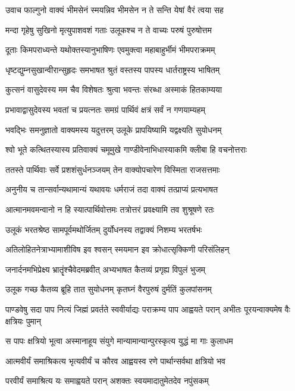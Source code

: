 \twolineshloka
{उवाच फाल्गुनो वाक्यं भीमसेनं स्मयन्निव}
{भीमसेन न ते सन्ति येषां वैरं त्वया सह}


\twolineshloka
{मन्दा गृहेषु सुखिनो मृत्युपाशवशं गताः}
{उलूकश्च न ते वाच्यः परुषं पुरुषोत्तम}


\twolineshloka
{दूताः किमपराध्यन्ते यथोक्तस्यानुभाषिणः}
{एवमुक्त्वा महाबाहुर्भीमं भीमपराक्रमम्}


\twolineshloka
{धृष्टद्युम्नसुखान्वीरान्सुहृदः समभाषत}
{श्रुतं वस्तस्य पापस्य धार्तराष्ट्रस्य भाषितम्}


\twolineshloka
{कुत्सनं वासुदेवस्य मम चैव विशेषतः}
{श्रुत्वा भवन्तः संरब्धा अस्माकं हितकाम्यया}


\twolineshloka
{प्रभावाद्वासुदेवस्य भवतां च प्रयत्नतः}
{समग्रं पार्थिवं क्षत्रं सर्वं न गणयाम्यहम्}


\twolineshloka
{भवद्भिः समनुज्ञातो वाक्यमस्य यदुत्तरम्}
{उलूके प्रापयिष्यामि यद्वक्ष्यति सुयोधनम्}


\threelineshloka
{श्वो भूते कत्थितस्यास्य प्रतिवाक्यं चमूमुखे}
{गाण्डीवेनाभिधास्याकमि क्लीबा हि वचनोत्तराः}
{}


\twolineshloka
{ततस्ते पार्थिवाः सर्वे प्रशशंसुर्धनञ्जयम्}
{तेन वाक्योपचारेण विस्मिता राजसत्तमाः}


\twolineshloka
{अनुनीय च तान्सर्वान्यथामान्यं यथावयः}
{धर्मराजं तदा वाक्यं तत्प्राप्यं प्रत्यभाषत}


\twolineshloka
{आत्मानमवमन्वानो न हि स्यात्पार्थिवोत्तमः}
{तत्रोत्तरं प्रवक्ष्यामि तव शुश्रूषणे रतः}


\twolineshloka
{उलूकं भरतश्रेष्ठ सामपूर्वमथोर्जितम्}
{दुर्योधनस्य तद्वाक्यं निशम्य भरतर्षभः}


\twolineshloka
{अतिलोहितनेत्राभ्यामाशीविष इव श्वसन्}
{स्मयमान इव क्रोधात्सृक्किणी परिसंलिहन्}


\twolineshloka
{जनार्दनमभिप्रेक्ष्य भ्रातॄंश्चैवेदमब्रवीत्}
{अभ्यभाषत कैतव्यं प्रगृह्य विपुलं भुजम्}


\twolineshloka
{उलूक गच्छ कैतव्य ब्रूहि तात सुयोधनम्}
{कृतघ्नं वैरपुरुषं दुर्मतिं कुलपांसनम्}


\threelineshloka
{पाण्डवेषु सदा पाप नित्यं जिह्मं प्रवर्तते}
{स्ववीर्याद्यः पराक्रम्य पाप आह्वयते परान्}
{अभीतः पूरयन्वाक्यमेष वैः क्षत्रियः पुमान्}


\twolineshloka
{स पापः क्षत्रियो भूत्वा अस्मानाहूय संयुगे}
{मान्यामान्यान्पुरस्कृत्य युद्धं मा गाः कुलाधम}


\twolineshloka
{आत्मवीर्यं समाश्रिकत्य भृत्यवीर्यं च कौरव}
{आह्वयस्व रणे पार्थान्सर्वथा क्षत्रियो भव}


\twolineshloka
{परवीर्यं समाश्रित्य यः समाह्वयते परान्}
{अशक्तः स्वयमादातुमेतदेव नपुंसकम्}


